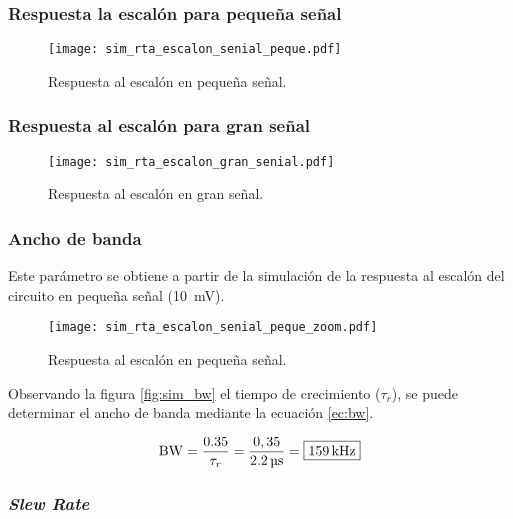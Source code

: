 \subsubsection{Respuesta la escalón para pequeña señal}

\begin{figure}[H]
	\centering
	\texttt{[image: sim\_rta\_escalon\_senial\_peque.pdf]}
	\caption{Respuesta al escalón en pequeña señal.}
	\label{fig:rta_escalon_peque}
\end{figure}

\subsubsection{Respuesta al escalón para gran señal}

\begin{figure}[H]
	\centering
	\texttt{[image: sim\_rta\_escalon\_gran\_senial.pdf]}
	\caption{Respuesta al escalón en gran señal.}
	\label{fig:rta_escalon_gran}
\end{figure}

\subsubsection{Ancho de banda}

	Este parámetro se obtiene a partir de la simulación de la respuesta al escalón del circuito en pequeña señal (\SI{10}{\milli\volt}).

\begin{figure}[H]
	\centering
	\texttt{[image: sim\_rta\_escalon\_senial\_peque\_zoom.pdf]}
	\caption{Respuesta al escalón en pequeña señal.}
	\label{fig:rta_escalon_peque}
\end{figure}

	Observando la figura \ref{fig:sim_bw} el tiempo de crecimiento ($\tau_r$), se puede determinar el ancho de banda mediante la ecuación \eqref{ec:bw}.

	\begin{equation}
		\centering
		\mathrm{BW} = \frac{\num{0,35}}{\tau_r} = \frac{0,35}{\SI{2.2}{\micro\second}} = \boxed{\SI{159}{\kilo\hertz}}
		\label{ec:bw}
	\end{equation}

\subsubsection{\textit{Slew Rate}}

